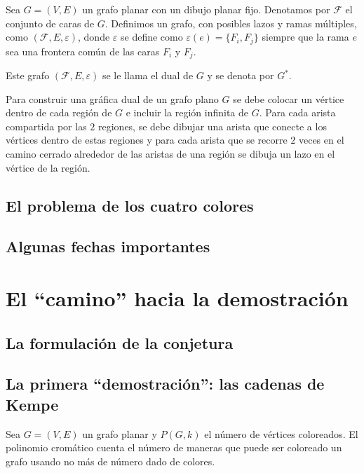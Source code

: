\documentclass[3p,times,a4paper,twocolumn,authoryear]{elsarticle} %
\begin{document}
\begin{definition}
Sea $G=(V,E)$ un grafo planar con un dibujo planar fijo. Denotamos por $\mathcal{F}$ el conjunto de caras de $G$. Definimos un grafo, con posibles lazos y ramas múltiples, como $(\mathcal{F},E,\varepsilon)$, donde $\varepsilon$ se define como $\varepsilon(e)=\{F_i,F_j\}$ siempre que la rama $e$ sea una frontera común de las caras $F_i$ y $F_j$.

Este grafo $\left(\mathcal{F},E,\varepsilon\right)$ se le llama el dual de $G$ y se denota por $G^{\ast}$.	
\end{definition}

\begin{example}
Para construir una gráfica dual de un grafo plano $G$ se debe colocar un vértice dentro de cada región de $G$ e incluir la región infinita de $G$. Para cada arista compartida por las $2$ regiones, se debe dibujar una arista que conecte a los vértices dentro de estas regiones y para cada arista que se recorre $2$ veces en el camino cerrado alrededor de las aristas de una región se dibuja un lazo en el vértice de la región. 
\end{example}

\subsection{El problema de los cuatro colores}

\subsection{Algunas fechas importantes}

\section{El ``camino'' hacia la demostración}

\subsection{La formulación de la conjetura}

\subsection{La primera ``demostración'': las cadenas de Kempe}

\begin{definition}
Sea $G=(V,E)$ un grafo planar y $P(G,k)$ el número de vértices coloreados.
El polinomio cromático cuenta el número de maneras que puede ser coloreado un grafo usando no más de número dado de colores.
\end{definition}
\end{document}
